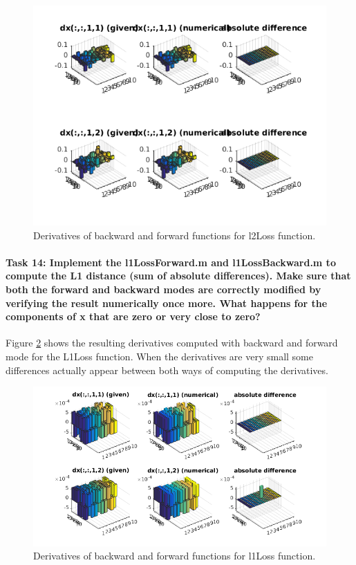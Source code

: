 \documentclass[12pt]{article}
\begin{document}
\begin{figure}[htbp]
 \centering
\includegraphics[width=\textwidth]{23a}
\caption{Derivatives of backward and forward functions for l2Loss function.}
 \label{fig:23a}
\end{figure}

\paragraph{Task 14: Implement the l1LossForward.m and l1LossBackward.m to compute the L1 distance (sum of absolute differences). Make sure that both the forward and backward modes are correctly modified by verifying the result numerically once more. What happens for the components of x that are zero or very close to zero?} Figure \ref{fig:23b} shows the resulting derivatives computed with backward and forward mode for the L1Loss function. When the derivatives are very small some differences actually appear between both ways of computing the derivatives.

\begin{figure}[htbp]
 \centering
\includegraphics[width=\textwidth]{23bb}
\caption{Derivatives of backward and forward functions for l1Loss function.}
 \label{fig:23b}
\end{figure}
\end{document}
